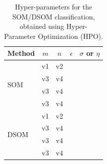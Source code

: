 \documentclass[utf8]{frontiersSCNS} %
\begin{document}
\begin{table}\centering
	\begin{tabular}{@{}lcccc@{}}
		\toprule
		Method & $m$ & $n$ & $\epsilon$ & $\sigma$ or $\eta$ \\
		\midrule
		\multirow{4}{*}{SOM} & v1 & v2 \\
						  	  & v3 & v4 \\
						  	  & v3 & v4 \\
						  	  & v3 & v4 \\
		\midrule
		\multirow{4}{*}{DSOM} & v1 & v2 \\
							   & v3 & v4 \\
							   & v3 & v4 \\	
							   & v3 & v4 \\
		\bottomrule
	\end{tabular}
	\caption{Hyper-parameters for the SOM/DSOM classification, obtained using Hyper-Parameter Optimization (HPO).}
	\label{tab:swtypes}
\end{table}
\end{document}
